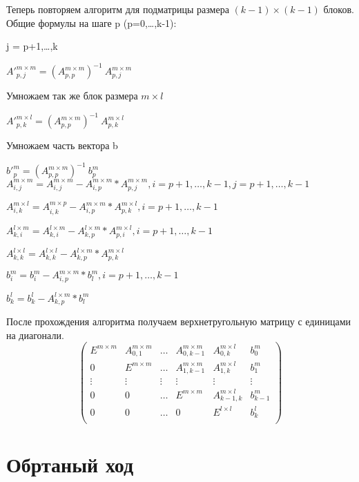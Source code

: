 \documentclass[12pt]{scrreprt}
\begin{document}
Теперь повторяем алгоритм для подматрицы размера $(k-1) \times (k-1)$ блоков.
Общие формулы на шаге p (p=0,\ldots,k-1):

j = p+1,\ldots,k

${A'}_{p, j}^{m \times m} = (A_{p, p}^{m \times m})^{-1} \ A_{p, j}^{m \times m}$

Умножаем так же блок размера $m \times l$

${A'}_{p, k}^{m \times l} = (A_{p, p}^{m \times m})^{-1} \ A_{p, k}^{m \times l}$

Умножаем часть вектора b

${b'}_{p}^{m} = (A_{p, p}^{m \times m})^{-1} \ b_{p}^{m}$\\

\( A_{i,j}^{m \times m} = A_{i,j}^{m \times m} - A_{i,p}^{m \times m}*A_{p,j}^{m \times m}, i=p+1,\ldots,k-1,  j=p+1,\ldots,k-1 \)

\( A_{i,k}^{m \times l} = A_{i,k}^{m \times p} - A_{i,p}^{m \times m}*A_{p,k}^{m \times l}, i=p+1,\ldots,k-1\)

\( A_{k,i}^{l \times m} = A_{k,i}^{l \times m} - A_{k,p}^{l \times m}*A_{p,i}^{m \times l}, i=p+1,\ldots,k-1\)

\( A_{k,k}^{l \times l} = A_{k,k}^{l \times l} - A_{k,p}^{l \times m}*A_{p,k}^{m \times l}\)

\( b_{i}^{m} = b_{i}^{m} - A_{i,p}^{m \times m}*b_{l}^{m}, i=p+1,\ldots,k-1\)

\( b_{k}^{l} = b_{k}^{l} - A_{k,p}^{l \times m}*b_{l}^{m}\)

После прохождения алгоритма получаем верхнетругольную матрицу с единицами на диагонали.
\[ \left( \begin{matrix}
{E^{m \times m}} & {{A}_{0, 1}^{m \times m}} & {\dots} & {{A}_{0, k-1}^{m \times m}} & {{A}_{0, k}^{m \times l}} & {{b}_{0}^{m}} \\
{0} & {E^{m \times m}} & {\dots} & {A_{1, k-1}^{m \times m}} & {A_{1, k}^{m \times l}} & {b_{1}^{m}} \\
{\vdots} & {\vdots} & {\vdots} & {\vdots} & {\vdots} & {\vdots} \\
{0} & {0} & {\dots} & {E^{m \times m}} & {A_{k-1, k}^{m \times l}} & {b_{k-1}^{m}} \\
{0} & {0} & {\dots} & {0} & {E^{l \times l}} & {b_{k}^{l}}\\
\end{matrix}\right) \]
\section{Обртаный ход}
\end{document}
